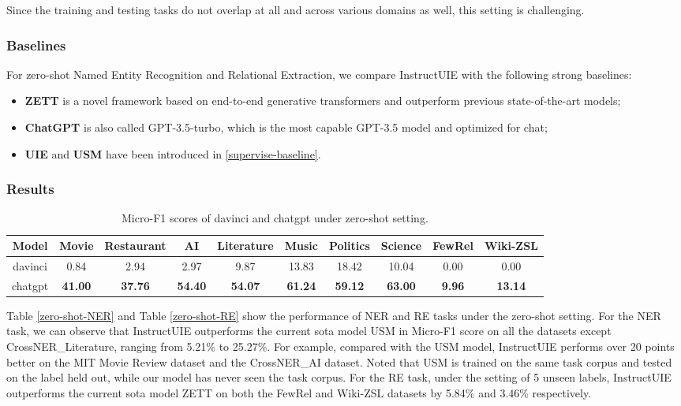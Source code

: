 \documentclass[11pt]{article}
\begin{document}
Since the training and testing tasks do not overlap at all and across various domains as well, this setting is challenging.

\subsubsection{Baselines}
For zero-shot Named Entity Recognition and Relational Extraction, we compare InstructUIE with the following strong baselines:
\begin{itemize}
\item \textbf{ZETT}\cite{zett} is a novel framework based on end-to-end generative transformers and outperform previous state-of-the-art models;
\item \textbf{ChatGPT} \cite{InstructGPT} is also called GPT-3.5-turbo, which is the most capable GPT-3.5 model and optimized for chat;
\item \textbf{UIE} and \textbf{USM} have been introduced in \ref{supervise-baseline}.
\end{itemize}

\subsubsection{Results}


\begin{table*}[htbp]
    \centering
    \begin{tabular}{c|ccccccc|cc}
    \toprule
        Model & Movie & Restaurant & AI & Literature & Music & Politics & Science & FewRel & Wiki-ZSL \\
        \midrule
        davinci & 0.84 & 2.94 & 2.97 & 9.87 & 13.83 & 18.42 & 10.04 & 0.00 & 0.00 \\
        chatgpt & \textbf{41.00} & \textbf{37.76} & \textbf{54.40} & \textbf{54.07} & \textbf{61.24} & \textbf{59.12} & \textbf{63.00} & \textbf{9.96} & \textbf{13.14} \\
    \bottomrule
    \end{tabular}
    \caption{\label{zero-shot-GPT}
    Micro-F1 scores of davinci and chatgpt under zero-shot setting.}
\end{table*}

Table \ref{zero-shot-NER} and Table \ref{zero-shot-RE} show the performance of NER and RE tasks under the zero-shot setting. For the NER task, we can observe that InstructUIE outperforms the current sota model USM in Micro-F1 score on all the datasets except CrossNER\_Literature, ranging from 5.21\% to 25.27\%. For example, compared with the USM model, InstructUIE performs over 20 points better on the MIT Movie Review dataset and the CrossNER\_AI dataset. Noted that USM is trained on the same task corpus and tested on the label held out, while our model has never seen the task corpus. For the RE task, under the setting of 5 unseen labels, InstructUIE outperforms the current sota model ZETT on both the FewRel and Wiki-ZSL datasets by 5.84\% and 3.46\% respectively.
\end{document}
